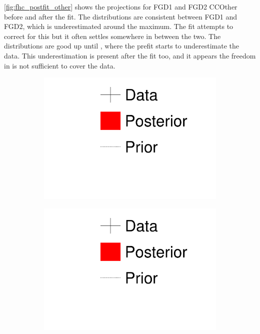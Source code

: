 \autoref{fig:fhc_postfit_other} shows the projections for FGD1 and FGD2 CCOther before and after the fit. The \pmu distributions are consistent between FGD1 and FGD2, which is underestimated around the maximum. The fit attempts to correct for this but it often settles somewhere in between the two. The \cosmu distributions are good up until , where the prefit starts to underestimate the data. This underestimation is present after the fit too, and it appears the freedom in \cosmu is not sufficient to cover the data. 
\begin{figure}[h]
	\begin{subfigure}[t]{0.15\textwidth}
		\includegraphics[width=\textwidth, trim={0mm 90mm 0mm 0mm}, clip,page=1]{figures/mach3/1D_legend_Data_Posterior_Prior}
	\end{subfigure}
	\begin{subfigure}[t]{0.15\textwidth}
		\includegraphics[width=\textwidth, trim={0mm 45mm 0mm 50mm}, clip,page=1]{figures/mach3/1D_legend_Data_Posterior_Prior}

\end{subfigure}
\end{figure}
